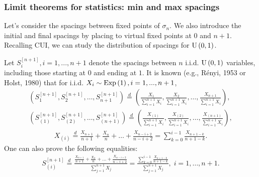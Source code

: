 \documentclass[12pt,pdf,aspectratio=169,t]{beamer}
\begin{document}
    \begin{frame}[allowframebreaks]
        \frametitle{Limit theorems for statistics: min and max spacings}
        Let's consider the spacings between fixed points of $\sigma_n$.
        We also introduce the initial and final spacings by placing to virtual
        fixed points at $0$ and $n+1$.
        Recalling CUI, we can study the distribution of spacings for $\mathrm{U}\left(0, 1\right)$.

        Let $S_i^{[n+1]}, i=1,...,n+1$ denote the spacings between $n$ i.i.d. $\mathrm{U}\left(0, 1\right)$ variables,
        including those starting at $0$ and ending at $1$.
        It is known (e.g., Rényi, 1953 or Holst, 1980) that for i.i.d. $X_i \sim \mathrm{Exp}\left(1\right), i = 1,..., n+1$,
        \vspace{-1em}
        \begin{gather}
            \label{distr_equal_1}
            \left(
                S_1^{[n+1]}, S_2^{[n+1]}, \dots, S_{n+1}^{[n+1]}
            \right)
            \overset{d}{=}
            \left(
                \frac{X_1}{\sum_{i=1}^{n+1} X_i},
                \frac{X_2}{\sum_{i=1}^{n+1} X_i},
                \dots,
                \frac{X_{n+1}}{\sum_{i=1}^{n+1} X_i}
            \right), \\
            \label{distr_equal_2}
            \left(
                S_{(1)}^{[n+1]}, S_{(2)}^{[n+1]}, \dots, S_{(n+1)}^{[n+1]}
            \right)
            \overset{d}{=}
            \left(
                \frac{X_{(1)}}{\sum_{i=1}^{n+1} X_i},
                \frac{X_{(2)}}{\sum_{i=1}^{n+1} X_i},
                \dots,
                \frac{X_{(n+1)}}{\sum_{i=1}^{n+1} X_i}
            \right), 
        \end{gather}
        \begin{gather}
            \label{distr_equal_3}
            X_{(i)} \overset{d}{=}
            \frac{X_{n+1}}{n+1} + \frac{X_{n}}{n} + \dots + \frac{X_{n-i+2}}{n-i+2} = 
            \sum_{k=0}^{i-1} \frac{X_{n+1-k}}{n+1-k}.
        \end{gather}
        One can also prove the following equalities:
        \begin{gather}\label{distr_equal_4}
            S_{(i)}^{[n+1]} \overset{d}{=}
            \frac{
                \frac{X_{n+1}}{n+1} + \frac{X_{n}}{n} + \dots + \frac{X_{n-i+2}}{n-i+2}
            }{
                \sum_{j=1}^{n+1} X_j
            } = \frac{
                \sum_{k=0}^{i-1} \frac{X_{n+1-k}}{n+1-k}
            }{
                \sum_{j=1}^{n+1} X_j
            }, \; i = 1, \dots, n+1.
        \end{gather}


\end{frame}
\end{document}
